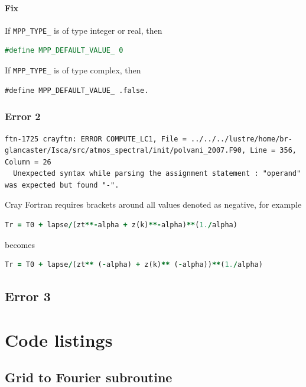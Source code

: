 \documentclass[a4paper,11pt]{report}
\begin{document}
\subsubsection*{Fix}
If \texttt{MPP\_TYPE\_} is of type integer or real, then 
\begin{lstlisting}[language=Fortran]
#define MPP_DEFAULT_VALUE_ 0
\end{lstlisting}
\par
If \texttt{MPP\_TYPE\_} is of type complex, then 
\begin{lstlisting}
#define MPP_DEFAULT_VALUE_ .false.
\end{lstlisting}

\subsection*{Error 2}

\begin{lstlisting}
ftn-1725 crayftn: ERROR COMPUTE_LC1, File = ../../../lustre/home/br-glancaster/Isca/src/atmos_spectral/init/polvani_2007.F90, Line = 356, Column = 26 
  Unexpected syntax while parsing the assignment statement : "operand" was expected but found "-".
\end{lstlisting}
Cray Fortran requires brackets around all values denoted as negative, for example
\begin{lstlisting}[language=Fortran]
Tr = T0 + lapse/(zt**-alpha + z(k)**-alpha)**(1./alpha)
\end{lstlisting}
becomes 
\begin{lstlisting}[language=Fortran]
Tr = T0 + lapse/(zt** (-alpha) + z(k)** (-alpha))**(1./alpha)
\end{lstlisting}

\section*{Error 3}



\chapter{Code listings}
\label{apdx:codelisting}

\section*{Grid to Fourier subroutine}
\end{document}
